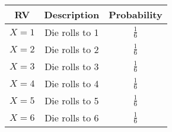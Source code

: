 
\begin{center}
\begin{tabular}{|c|c|c|}
\hline
\textbf{RV} & \textbf{Description} & \textbf{Probability}\\ \hline
$X = 1$	    &   Die rolls to 1  & $\frac{1}{6}$\\ \hline
$X = 2$	    &   Die rolls to 2  & $\frac{1}{6}$\\ \hline
$X = 3$	    &   Die rolls to 3  & $\frac{1}{6}$ \\ \hline
$X = 4$	    &   Die rolls to 4  & $\frac{1}{6}$ \\ \hline
$X = 5$	    &   Die rolls to 5  & $\frac{1}{6}$ \\ \hline
$X = 6$	    &   Die rolls to 6  & $\frac{1}{6}$ \\ \hline
\end{tabular}
\end{center}
